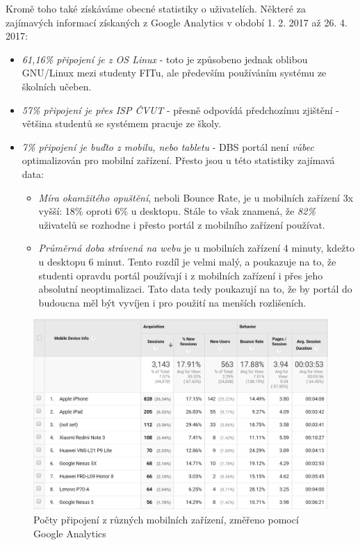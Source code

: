 Kromě toho také získáváme obecné statistiky o uživatelích. Některé za zajímavých informací získaných z Google Analytics v období 1. 2. 2017 až 26. 4. 2017:
\begin{itemize}
	\item \emph{61,16\% připojení je z OS Linux} - toto je způsobeno jednak oblibou GNU/Linux mezi studenty FITu, ale především používáním systému ze školních učeben.
	\item \emph{57\% připojení je přes ISP ČVUT} - přesně odpovídá předchozímu zjištění - většina studentů se systémem pracuje ze školy.
	\item \emph{7\% připojení je buďto z mobilu, nebo tabletu} - DBS portál není \emph{vůbec} optimalizován pro mobilní zařízení. Přesto jsou u této statistiky zajímavá data:
	\begin{itemize}
		\item \emph{Míra okamžitého opuštění}, neboli Bounce Rate, je u mobilních zařízení 3x vyšší: 18\% oproti 6\% u desktopu. Stále to však znamená, že \emph{82\%} uživatelů se rozhodne i přesto portál z mobilního zařízení používat.
		\item \emph{Průměrná doba strávená na webu} je u mobilních zařízení 4 minuty, kdežto u desktopu 6 minut. Tento rozdíl je velmi malý, a poukazuje na to, že studenti opravdu portál používají i z mobilních zařízení i přes jeho absolutní neoptimalizaci. Tato data tedy poukazují na to, že by portál do budoucna měl být vyvíjen i pro použití na menších rozlišeních.
	\end{itemize}
\end{itemize}
\begin{figure}[H]
\includegraphics[width=\textwidth]{../png/analytics-mobile.png}
\caption{Počty připojení z různých mobilních zařízení, změřeno pomocí Google Analytics} \label{picture:analytics-mobile}
\end{figure}

